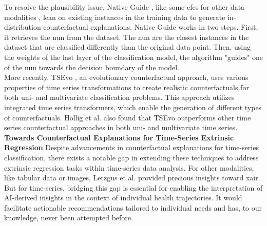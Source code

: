 To resolve the plausibility issue, Native Guide \cite{delaney_instance-based_2021}, like some \acrshort{cfe}s for other data modalities \cite{keane_good_2020, kenny_twin-systems_2019, hollig_tsevo_2022, nugent_gaining_2009, leake_introduction_2005}, lean on existing instances in the training data to generate in-distribution counterfactual explanations. Native Guide works in two steps. First, it retrieves the \acrfull{nun} from the dataset. The \acrshort{nun} are the closest instances in the dataset that are classified differently than the original data point.
Then, using the weights of the last layer of the classification model, the algorithm "guides"  one of the \acrshort{nun} towards the decision boundary of the model.\\


 More recently, TSEvo \cite{hollig_tsevo_2022}, an evolutionary counterfactual approach, uses various properties of time series transformations to create realistic counterfactuals for both uni- and multivariate classification problems. This approach utilizes integrated time series transformers, which enable the generation of different types of counterfactuals. Höllig et al. \cite{hollig_tsevo_2022} also found that TSEvo outperforms other time series counterfactual approaches in both uni- and multivariate time series.\\

\textbf{Towards Counterfactual Explanations for Time-Series Extrinsic Regression} Despite advancements in counterfactual explanations for time-series classification, there exists a notable gap in extending these techniques to address extrinsic regression tasks within time-series data analysis. For other modalities, like tabular data or images, Letzgus et al. \cite{letzgus_toward_2022} provided precious insights toward \acrfull{xair}. But for time-series, bridging this gap is essential for enabling the interpretation of AI-derived insights in the context of individual health trajectories. It would facilitate actionable recommendations tailored to individual needs and has, to our knowledge, never been attempted before.
